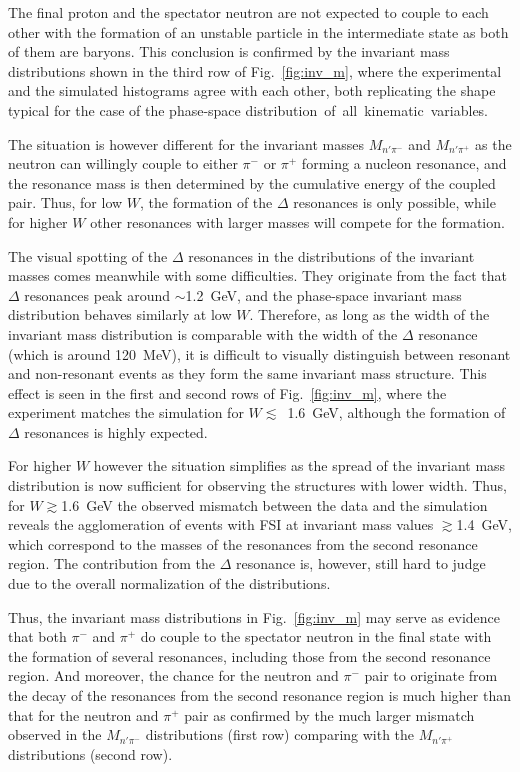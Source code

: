 The final proton and the spectator neutron are not expected to couple to each other with the formation of an unstable particle in the intermediate state as both of them are baryons. This conclusion is confirmed by the invariant mass distributions shown in the third row of Fig.~\ref{fig:inv_m}, where the experimental and the simulated histograms agree with each other, both replicating the shape typical for the case of the phase-space distribution~of~all~kinematic~variables.


The situation is however different for the invariant masses $M_{n'\pi^{-}}$ and $M_{n'\pi^{+}}$ as the neutron can willingly couple to either $\pi^{-}$ or $\pi^{+}$ forming a nucleon resonance, and the resonance mass is then determined by the cumulative energy of the coupled pair. Thus, for low $W$, the formation of the $\Delta$ resonances is only possible, while for higher $W$ other resonances with larger masses will compete for the formation. 

The visual spotting of the $\Delta$ resonances in the distributions of the invariant masses comes meanwhile with some difficulties. They originate from the fact that $\Delta$ resonances peak around $\sim$1.2~GeV, and the phase-space invariant mass distribution behaves similarly at low $W$. Therefore, as long as the width of the invariant mass distribution is comparable with the width of the $\Delta$ resonance (which is around 120~MeV), it is difficult to visually distinguish between resonant and non-resonant events as they form the same invariant mass structure. This effect is seen in the first and second rows of Fig.~\ref{fig:inv_m}, where the experiment matches the simulation for $W\lesssim$~1.6~GeV, although the formation of $\Delta$ resonances is highly expected.

For higher $W$ however the situation simplifies as the spread of the invariant mass distribution is now sufficient for observing the structures with lower width. Thus, for $W\gtrsim$1.6~GeV the observed mismatch between the data and the simulation reveals the agglomeration of events with FSI at invariant mass values $\gtrsim$1.4~GeV, which correspond to the masses of the resonances from the second resonance region. The contribution from the $\Delta$ resonance is, however, still hard to judge due to the overall normalization of the distributions.

Thus, the invariant mass distributions in Fig.~\ref{fig:inv_m} may serve as evidence that both $\pi^{-}$ and $\pi^{+}$ do couple to the spectator neutron in the final state with the formation of several resonances, including those from the second resonance region. And moreover, the chance for the neutron and $\pi^{-}$ pair to originate from the decay of the resonances from the second resonance region is much higher than that for the neutron and $\pi^{+}$ pair as confirmed by the much larger mismatch observed in the $M_{n'\pi^{-}}$ distributions (first row) comparing with the $M_{n'\pi^{+}}$ distributions (second row).



